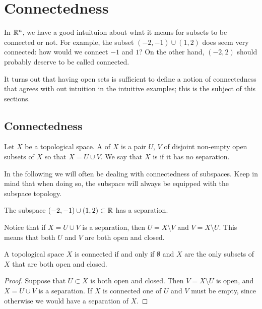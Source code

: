 \section{Connectedness}
\label{connectedness}
In $\mathbb{R}^n$, we have a good intuituion about what it means for subsets to be connected or not. For example, the subset $(-2,-1) \cup (1,2)$ does seem very connected: how would we connect $-1$ and $1$? On the other hand, $(-2,2)$ should probably deserve to be called connected.

It turns out that having open sets is sufficient to define a notion of connectedness that agrees with out intuition in the intuitive examples; this is the subject of this sections.

\subsection{Connectedness}
\begin{defn}
  Let $X$ be a topological space. A  of $X$ is a pair $U$, $V$ of disjoint non-empty open subsets of $X$ so that $X = U \cup V$. We say that $X$ is  if it has no separation.
\end{defn}
In the following we will often be dealing with connectedness of subspaces. Keep in mind that when doing so, the subspace will always be equipped with the subspace topology.
\begin{example}
  The subspace $(-2,-1) \cup (1,2) \subset \mathbb{R}$ has a separation.
\end{example}
Notice that if $X = U \cup V$ is a separation, then $U = X \setminus V$ and $V = X \setminus U$. This means that both $U$ and $V$ are both open and closed.
\begin{lem}
  A topological space $X$ is connected if and only if $\emptyset$ and $X$ are the only subsets of $X$ that are both open and closed.
\end{lem}
\begin{proof}
  Suppose that $U \subset X$ is both open and closed. Then $V = X \setminus U$ is open, and $X = U \cup V$ is a separation. If $X$ is connected one of $U$ and $V$ must be empty, since otherwise we would have a separation of $X$.
\end{proof}

